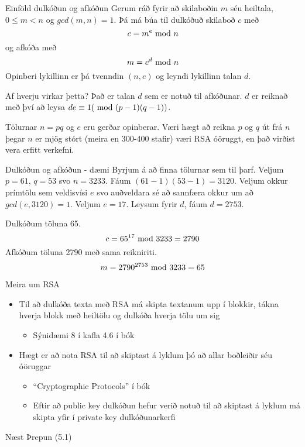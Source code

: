 \documentclass[handout]{beamer}
\begin{document}
\begin{frame}{Einföld dulkóðun og afkóðun}
Gerum ráð fyrir að skilaboðin $m$ séu heiltala, $0 \leq m < n$ og $gcd(m, n) = 1$. Þá má búa til dulkóðuð skilaboð $c$ með
\[
c = m^e \ \text{mod}\ n
\]
og afkóða með 
\[
 m = c^d \ \text{mod}\ n
\]
Opinberi lykillinn er þá tvenndin $(n, e)$ og leyndi lykillinn talan $d$.

\end{frame}

\begin{frame}{Af hverju virkar þetta?}
Það er talan $d$ sem er notuð til afkóðunar. $d$ er reiknað með því að leysa $de \equiv 1 (\ \text{mod}\ (p-1)(q-1))$.

Tölurnar $n = pq$ og $e$ eru gerðar opinberar. Væri hægt að reikna $p$ og $q$ út frá $n$ þegar $n$ er mjög stórt (meira en 300-400 stafir) væri RSA óöruggt, en það virðist vera erfitt verkefni.
\end{frame}

\begin{frame}{Dulkóðun og afkóðun - dæmi}
Byrjum á að finna tölurnar sem til þarf. Veljum $p=61$, $q = 53$ svo $n = 3233$. Fáum $(61 - 1)(53 - 1) = 3120$. Veljum okkur prímtölu sem veldisvísi $e$ svo auðveldara sé að sannfæra okkur um að $gcd(e,3120)=1$. Veljum $e = 17$. Leysum fyrir $d$, fáum $d = 2753$.

Dulkóðum töluna 65.
\[
 c = 65^{17} \ \text{mod}\ 3233 = 2790
\]
Afkóðum töluna 2790 með sama reikniriti.
\[
 m = 2790^{2753} \ \text{mod}\ 3233 = 65
\]
\end{frame}

\begin{frame}{Meira um RSA}
\begin{itemize}
 \item Til að dulkóða texta með RSA má skipta textanum upp í blokkir, tákna hverja blokk með heiltölu og dulkóða hverja tölu um sig
 \begin{itemize}
  \item Sýnidæmi 8 í kafla 4.6 í bók
 \end{itemize}
 \item Hægt er að nota RSA til að skiptast á lyklum þó að allar boðleiðir séu óöruggar
 \begin{itemize}
  \item ``Cryptographic Protocols'' í bók
  \item Eftir að public key dulkóðun hefur verið notuð til að skiptast á lyklum má skipta yfir í private key dulkóðunarkerfi
 \end{itemize}
\end{itemize}
\end{frame}

\begin{frame}{Næst}
Þrepun (5.1)
\end{frame}
\end{document}
